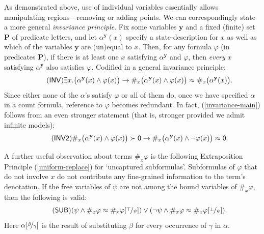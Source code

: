 \documentclass[12pt,oneside,reqno]{amsart}
\theoremstyle{definition}
\begin{document}
As demonstrated above, use of individual variables essentially allows manipulating regions---removing or adding points. We can correspondingly state a more general \emph{invariance principle}. Fix some variables $\mathbf{y}$ and a fixed (finite) set $\mathbf{P}$ of predicate letters, and let $\alpha^{\mathbf{y}}(x)$ specify a state-description for $x$ as well as which of the variables $\mathbf{y}$ are (un)equal to $x$. Then, for any formula $\varphi$ (in predicates $\mathbf{P}$), if there is at least one $x$ satisfying $\alpha^{\mathbf{y}}$ and $\varphi$, then \emph{every} $x$ satisfying $\alpha^{\mathbf{y}}$ also satisfies $\varphi$. Codified in a general invariance principle:
 \begin{equation} \tag{$\mathsf{INV}$} \exists x.\big(\alpha^{\mathbf{y}}(x) \wedge \varphi(x)\big) \rightarrow \#_x\big(\alpha^{\mathbf{y}}(x) \wedge \varphi(x)\big) \approx \#_x\big(\alpha^{\mathbf{y}}(x)\big). \label{invariance-main} \end{equation} Since either none of the $\alpha$'s satisfy $\varphi$ or all of them do, once we have specified $\alpha$ in a count formula, reference to $\varphi$ becomes redundant. In fact, (\ref{invariance-main}) follows from an even stronger statement (that is, stronger provided we admit infinite models): 
 \begin{equation} \tag{$\mathsf{INV2}$} \#_x\big(\alpha^{\mathbf{y}}(x) \wedge \varphi(x)\big) \succ \mathsf{0} \rightarrow \#_x\big(\alpha^{\mathbf{y}}(x) \wedge \neg \varphi(x)  \big) \approx \mathsf{0}. \label{invariance-infinite} \end{equation} 

 \vspace{0.5ex}
 
 A further useful observation about terms $\#_x\varphi$ is the following Extraposition Principle (\ref{uniform-replace}) for `uncaptured subformulas'. Subformulas of $\varphi$ that do not involve $x$ do not contribute any fine-grained information to the term's denotation. If the free variables of $\psi$ are not among the bound variables of $\#_x\varphi$, then the following is valid: \begin{equation} \tag{$\mathsf{SUB}$} (\psi \wedge \#_x\varphi \approx \#_x\varphi[\nicefrac{\top}{\psi}]) \vee (\neg\psi \wedge \#_x\varphi \approx \#_x\varphi[\nicefrac{\bot}{\psi}]).
    \label{uniform-replace}
 \end{equation} Here $\alpha[\nicefrac{\beta}{\gamma}]$ is the result of substituting $\beta$ for every occurrence of $\gamma$ in $\alpha$.  
 
\end{document}
